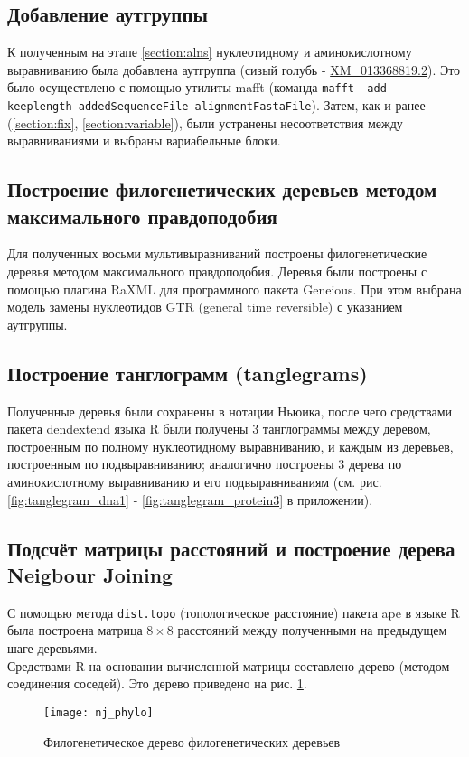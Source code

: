 \documentclass[a4paper,12pt]{article} %
\begin{document}
	\subsection{Добавление аутгруппы}
	К полученным на этапе \ref{section:alns} нуклеотидному и аминокислотному выравниванию была добавлена аутгруппа (сизый голубь - \href{https://www.ncbi.nlm.nih.gov/nuccore/XM_013368819.2}{XM\_013368819.2}). Это было осуществлено с помощью утилиты mafft (команда \texttt{mafft --add --keeplength addedSequenceFile alignmentFastaFile}). Затем, как и ранее (\ref{section:fix}, \ref{section:variable}), были устранены несоответствия между выравниваниями и выбраны вариабельные блоки. 
	\subsection{Построение филогенетических деревьев методом максимального правдоподобия}
	Для полученных восьми мультивыравниваний построены филогенетические деревья методом максимального правдоподобия. Деревья были построены с помощью плагина RaXML \cite{raxml} для программного пакета Geneious. При этом выбрана модель замены нуклеотидов GTR (general time reversible) с указанием аутгруппы.
	\subsection{Построение танглограмм (tanglegrams)}
	Полученные деревья были сохранены в нотации Ньюика, после чего средствами пакета dendextend языка R были получены 3 танглограммы между деревом, построенным по полному нуклеотидному выравниванию, и каждым из деревьев, построенным по подвыравниванию; аналогично построены 3 дерева по аминокислотному выравниванию и его подвыравниваниям (см. рис. \ref{fig:tanglegram_dna1} - \ref{fig:tanglegram_protein3} в приложении).
	\subsection{Подсчёт матрицы расстояний и построение дерева Neigbour Joining}
	
	С помощью метода \texttt{dist.topo} (топологическое расстояние) пакета ape в языке R была построена матрица $8\times8$ расстояний между полученными на предыдущем шаге деревьями.\\
	Средствами R на основании вычисленной матрицы составлено дерево (методом соединения соседей). Это дерево приведено на рис. \ref{fig:nj_phylo}.
	
	\begin{figure}[H]
		\centering \texttt{[image: nj\_phylo]}
		\caption{Филогенетическое дерево филогенетических деревьев}
		\label{fig:nj_phylo}
	\end{figure}
\end{document}
